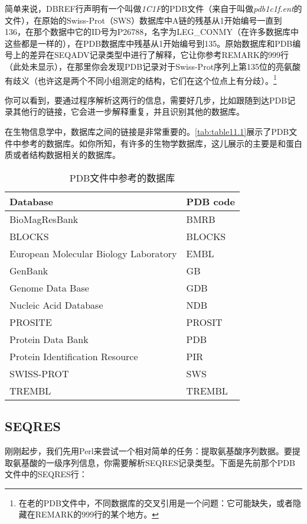 简单来说，DBREF行声明有一个叫做\textit{1C1F}的PDB文件（来自于叫做\textit{pdb1c1f.ent}的文件），在原始的Swiss-Prot（SWS）数据库中A链的残基从1开始编号一直到136，在那个数据中它的ID号为P26788，名字为LEG\_CONMY（在许多数据库中这些都是一样的），在PDB数据库中残基从1开始编号到135。原始数据库和PDB编号上的差异在SEQADV记录类型中进行了解释，它让你参考REMARK的999行（此处未显示），在那里你会发现PDB记录对于Swiss-Prot序列上第135位的亮氨酸有歧义（也许这是两个不同小组测定的结构，它们在这个位点上有分歧）。\footnote{在老的PDB文件中，不同数据库的交叉引用是一个问题：它可能缺失，或者隐藏在REMARK的999行的某个地方。} 

你可以看到，要通过程序解析这两行的信息，需要好几步，比如跟随到达PDB记录其他行的链接，它会进一步解释重复，并且识别其他的数据库。

在生物信息学中，数据库之间的链接是非常重要的。\autoref{tab:table11.1}展示了PDB文件中参考的数据库。如你所知，有许多的生物学数据库，这儿展示的主要是和蛋白质或者结构数据相关的数据库。

\begin{table}[!htbp]
  \begin{center}
  \caption{PDB文件中参考的数据库}
  \label{tab:table11.1}
  \begin{tabu} to 0.6\linewidth {X[3,l]X[1,l]}
  \toprule
  Database & PDB code\\
  \midrule
  BioMagResBank & BMRB \\
  BLOCKS & BLOCKS\\
  European Molecular Biology Laboratory & EMBL\\
  GenBank & GB\\
  Genome Data Base & GDB\\
  Nucleic Acid Database & NDB\\
  PROSITE & PROSIT\\
  Protein Data Bank & PDB\\
  Protein Identification Resource & PIR\\
  SWISS-PROT & SWS\\
  TREMBL & TREMBL\\
  \bottomrule
  \end{tabu}
  \end{center}
\end{table}

\subsection{SEQRES}
刚刚起步，我们先用Perl来尝试一个相对简单的任务：提取氨基酸序列数据。要提取氨基酸的一级序列信息，你需要解析SEQRES记录类型。下面是先前那个PDB文件中的SEQRES行：

